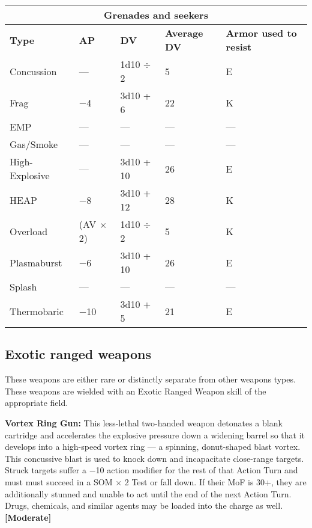 \begin{table} \begin{tabular}{|l|l|l|l|l|} \hline

\multicolumn{5}{|c|}{\textbf{Grenades and seekers}} \\ \hline

\textbf{Type}	&\textbf{AP}	&\textbf{DV}	&\textbf{Average DV}	&\textbf{Armor used to resist} \\ \hline

Concussion	&--- &1d10 $\div$ 2	&5	&E \\ \hline

Frag	&$-$4	&3d10 + 6	&22	&K \\ \hline

EMP	&--- &--- &--- &--- \\ \hline

Gas/Smoke	&--- &--- &--- &--- \\ \hline

High-Explosive	&--- &3d10 + 10	&26	&E \\ \hline

HEAP	&$-$8	&3d10 + 12	&28	&K \\ \hline

Overload	&(AV $\times$ 2)	&1d10 $\div$ 2	&5	&K \\ \hline

Plasmaburst	&$-$6	&3d10 + 10	&26	&E \\ \hline

Splash	&--- &--- &--- &--- \\ \hline

Thermobaric	&$-$10	&3d10 + 5	&21	&E \\ \hline

\end{tabular} \label{tab:grenades-seekers} \end{table} 

\subsection{Exotic ranged weapons} \label{sec:exotic-ranged-weapons} 

These weapons are either rare or distinctly separate from other weapons types. These weapons are wielded with an Exotic Ranged Weapon skill of the appropriate field. 

\textbf{Vortex Ring Gun:} This less-lethal two-handed weapon detonates a blank cartridge and accelerates the explosive pressure down a widening barrel so that it develops into a high-speed vortex ring --- a spinning, donut-shaped blast vortex. This concussive blast is used to knock down and incapacitate close-range targets. Struck targets suffer a $-$10 action modifier for the rest of that Action Turn and must must succeed in a SOM $\times$ 2 Test or fall down. If their MoF is 30+, they are additionally stunned and unable to act until the end of the next Action Turn. Drugs, chemicals, and similar agents may be loaded into the charge as well. \textbf{[Moderate]} 

